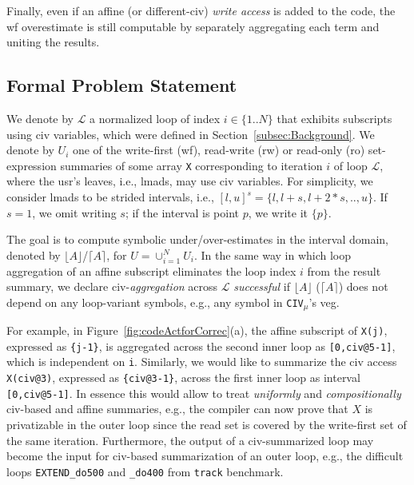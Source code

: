 \documentclass{sig-alternate}
\begin{document}
Finally, even if an affine (or different-{\sc civ})
{\em write access} is added to the code, the {\sc wf} overestimate
is still computable by separately aggregating each
term and uniting the results. %

\subsection{Formal Problem Statement}
\label{subsec:ProblemHL}

We denote by $\mathcal{L}$ a normalized loop of index $i\in\{1..N\}$ that
exhibits subscripts using {\sc civ} variables, which were defined
in Section~\ref{subsec:Background}. %
%
We denote by $U_i$ one of the write-first ({\sc wf}), read-write ({\sc rw})
or read-only ({\sc ro}) set-expression summaries of some array {\tt X} 
corresponding to iteration $i$ of loop $\mathcal{L}$, where the {\sc usr}'s 
leaves, i.e., {\sc lmad}s, may use {\sc civ} variables. 
%
For simplicity, we consider {\sc lmad}s to be 
strided intervals, i.e., $[l,u]^s=\{l, l+s, l+2*s, .., u\}$.
If $s=1$, we omit writing $s$; if the interval 
is point $p$, we write it $\{p\}$.
  

The goal is to compute symbolic under/over-estimates in the 
interval domain, denoted by $\lfloor A \rfloor$/$\lceil A \rceil$, 
for $U = \cup_{i=1}^{N} U_i$.
%
In the same way in which loop aggregation of an affine subscript  
eliminates the loop index $i$ from the result summary,
we declare {\sc civ}-{\em aggregation} across $\mathcal{L}$ {\em successful} 
if $\lfloor A \rfloor$ ($\lceil A \rceil$) does not depend on any loop-variant
symbols, e.g., any symbol in {\tt CIV}$_{\mu}$'s  {\sc veg}. %

For example, in Figure~\ref{fig:codeActforCorrec}(a), the affine
subscript of {\tt X(j)}, expressed as {\tt\{j-1\}}, is aggregated across 
the second inner loop as {\tt[0,civ@5-1]}, which is independent on {\tt i}. 
Similarly, we would like to summarize the {\sc civ} access
{\tt X(civ@3)}, expressed as {\tt\{civ@3-1\}}, across 
the first inner loop as interval {\tt[0,civ@5-1]}. 
%
In essence this would allow to treat {\em uniformly} and {\em compositionally} 
{\sc civ}-based and affine summaries, e.g., the compiler can now prove that $X$ 
is privatizable in the outer loop since the read set is covered by the write-first 
set of the same iteration. 
Furthermore, the output of a {\sc civ}-summarized loop may 
become the input for {\sc civ}-based summarization of an outer loop,
e.g., the difficult loops {\tt EXTEND\_do500} and {\tt \_do400}
from {\tt track} benchmark.
\end{document}
